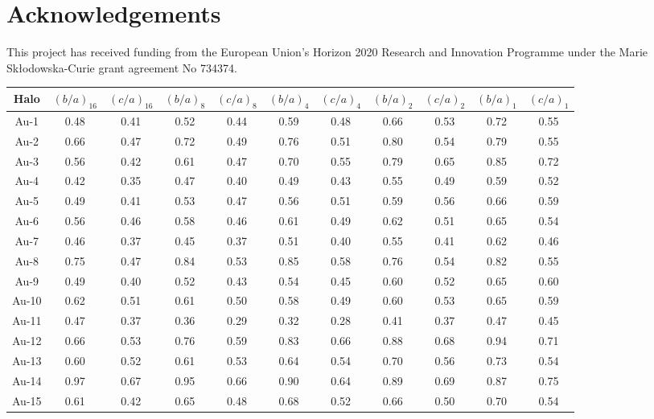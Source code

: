 \documentclass[usenatbib]{mnras}
\begin{document}
\section*{Acknowledgements}
This project has received funding from the European Union's Horizon
2020 Research and Innovation Programme under the Marie
Sk\l{}odowska-Curie grant agreement No 734374. 







\begin{table}
  \centering 
  \begin{tabular}{c c c c c c c c c c c}
  \hline\hline
  Halo & $(b/a)_{16}$ & $(c/a)_{16}$& $(b/a)_{8}$ & $(c/a)_{8}$& $(b/a)_{4}$ & $(c/a)_{4}$& $(b/a)_{2}$ & $(c/a)_{2}$& $(b/a)_{1}$ & $(c/a)_{1}$ \\
  \hline
Au-1 & 0.48 & 0.41 & 0.52 & 0.44 & 0.59 & 0.48 & 0.66 & 0.53 & 0.72 & 0.55\\
Au-2 & 0.66 & 0.47 & 0.72 & 0.49 & 0.76 & 0.51 & 0.80 & 0.54 & 0.79 & 0.55\\
Au-3 & 0.56 & 0.42 & 0.61 & 0.47 & 0.70 & 0.55 & 0.79 & 0.65 & 0.85 & 0.72\\
Au-4 & 0.42 & 0.35 & 0.47 & 0.40 & 0.49 & 0.43 & 0.55 & 0.49 & 0.59 & 0.52\\
Au-5 & 0.49 & 0.41 & 0.53 & 0.47 & 0.56 & 0.51 & 0.59 & 0.56 & 0.66 & 0.59\\
Au-6 & 0.56 & 0.46 & 0.58 & 0.46 & 0.61 & 0.49 & 0.62 & 0.51 & 0.65 & 0.54\\
Au-7 & 0.46 & 0.37 & 0.45 & 0.37 & 0.51 & 0.40 & 0.55 & 0.41 & 0.62 & 0.46\\
Au-8 & 0.75 & 0.47 & 0.84 & 0.53 & 0.85 & 0.58 & 0.76 & 0.54 & 0.82 & 0.55\\
Au-9 & 0.49 & 0.40 & 0.52 & 0.43 & 0.54 & 0.45 & 0.60 & 0.52 & 0.65 & 0.60\\
Au-10 & 0.62 & 0.51 & 0.61 & 0.50 & 0.58 & 0.49 & 0.60 & 0.53 & 0.65 & 0.59\\
Au-11 & 0.47 & 0.37 & 0.36 & 0.29 & 0.32 & 0.28 & 0.41 & 0.37 & 0.47 & 0.45\\
Au-12 & 0.66 & 0.53 & 0.76 & 0.59 & 0.83 & 0.66 & 0.88 & 0.68 & 0.94 & 0.71\\
Au-13 & 0.60 & 0.52 & 0.61 & 0.53 & 0.64 & 0.54 & 0.70 & 0.56 & 0.73 & 0.54\\
Au-14 & 0.97 & 0.67 & 0.95 & 0.66 & 0.90 & 0.64 & 0.89 & 0.69 & 0.87 & 0.75\\
Au-15 & 0.61 & 0.42 & 0.65 & 0.48 & 0.68 & 0.52 & 0.66 & 0.50 & 0.70 & 0.54\\

\end{tabular}
\end{table}
\end{document}
